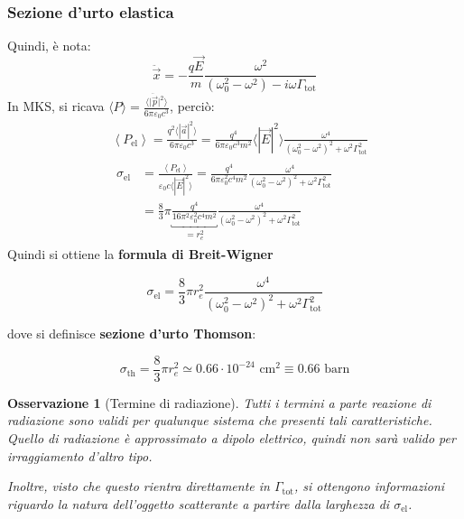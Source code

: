 \documentclass[10pt, a4paper]{scrartcl}
\numberwithin{equation}{subsection}
\theoremstyle{style1}
\newtheorem{osservazione}{Osservazione}[section]
\newenvironment{boxenv}[1][]{
    \begin{eqbox}[#1]
    }{
   \end{eqbox}
}
\begin{document}
\subsubsection{Sezione d'urto elastica}
Quindi, \`e nota:
\[
\ddot{\vec{x}} = - \frac{q \vec{E}}{m} \frac{\omega^2}{(\omega_0^2- \omega^2) -i\omega \Gamma _\text{tot}}
\] 
In MKS, si ricava $\langle P \rangle= \frac{\langle \lvert \ddot{\vec{p}} \rvert ^2 \rangle}{6\pi \varepsilon _0 c^3}$, perci\`o:
\begin{equation}
	\begin{split}
		&\left\langle P_\text{el} \right\rangle = \frac{q^2 \langle|\vec{a}|^2\rangle}{6 \pi \varepsilon _0 c^3} = \frac{q^4}{6\pi \varepsilon _0 c^3 m^2}\langle|\vec{E}|^2\rangle \frac{\omega^4}{(\omega_0^2 -\omega^2)^2 + \omega^2 \Gamma_\text{tot}^2}	\\
		&\begin{split}
			\sigma _\text{el} &= \frac{\left\langle P_\text{el} \right\rangle}{\varepsilon _0 c \langle|\vec{E}|^2 \rangle} = \frac{q^4}{6 \pi \varepsilon _0^2 c^4 m^2} \frac{\omega^4}{(\omega_0^2 - \omega^2 ) ^2 + \omega^2 \Gamma_\text{tot}^2}\\
			&=\frac{8}{3}\pi \underbracket{\frac{q^4}{16 \pi^2 \varepsilon _0^2 c^4 m^2}}_{= r_e^2}   \frac{\omega^4}{(\omega_0^2 - \omega^2 ) ^2 + \omega^2 \Gamma_\text{tot}^2}
		\end{split}
	\end{split}
\end{equation}
Quindi si ottiene la \textbf{formula di Breit-Wigner}
\begin{boxenv}[]
\begin{equation}
			\sigma _\text{el} = \frac{8}{3}\pi r_e^2  \frac{\omega^4}{(\omega_0^2 - \omega^2 ) ^2 + \omega^2 \Gamma_\text{tot}^2}
\end{equation}
\end{boxenv}
\noindent dove si definisce \textbf{sezione d'urto Thomson}:
\begin{boxenv}[]
\begin{equation}
	\sigma _\text{th}= \frac{8}{3}\pi r_e^2 \simeq 0.66 \cdot 10^{-24} \text{ cm}^{2} \equiv 0.66 \text{ barn}
\end{equation}
\end{boxenv}
\begin{osservazione}
	[Termine di radiazione]
	Tutti i termini a parte reazione di radiazione sono validi per qualunque sistema che presenti tali caratteristiche. Quello di radiazione \`e approssimato a dipolo elettrico, quindi non sar\`a valido per irraggiamento d'altro tipo.

	Inoltre, visto che questo rientra direttamente in $\Gamma_\text{tot}$, si ottengono informazioni riguardo la natura dell'oggetto scatterante a partire dalla larghezza di $\sigma _\text{el}$.
\end{osservazione}
\end{document}
